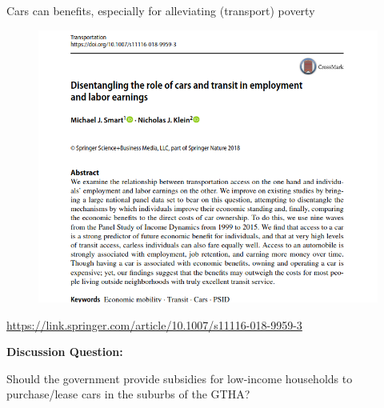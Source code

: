 \documentclass[aspectratio=169]{beamer}
\begin{document}
\begin{frame}
	
	Cars can benefits, especially for alleviating (transport) poverty
	
	\begin{figure}
		\centering
		\includegraphics[width=0.64\linewidth]{images/klein_smart_cars.png}
	\end{figure}

	\tiny\url{https://link.springer.com/article/10.1007/s11116-018-9959-3}
	
\end{frame}


%
%
%
%
%
%





\begin{frame}
	
	\textbf{Discussion Question:}
	
	\vspace{2mm}
	
	Should the government provide subsidies for low-income households to purchase/lease cars in the suburbs of the GTHA?
	
\end{frame}
\end{document}
